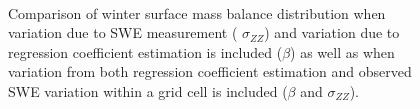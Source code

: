 \documentclass[12pt]{article}
\begin{document}
\begin{figure}[H]
	\centering
	\\
	\caption{Comparison of winter surface mass balance distribution when variation due to SWE measurement ( $\sigma_{ZZ}$) and variation due to regression coefficient estimation is included ($\beta$) as well as when variation from both regression coefficient estimation and observed SWE variation within a grid cell is included ($\beta$ and $\sigma_{ZZ}$). }
	\label{fig:WSMB_compareBetaAndZZBeta}
\end{figure}
\end{document}
